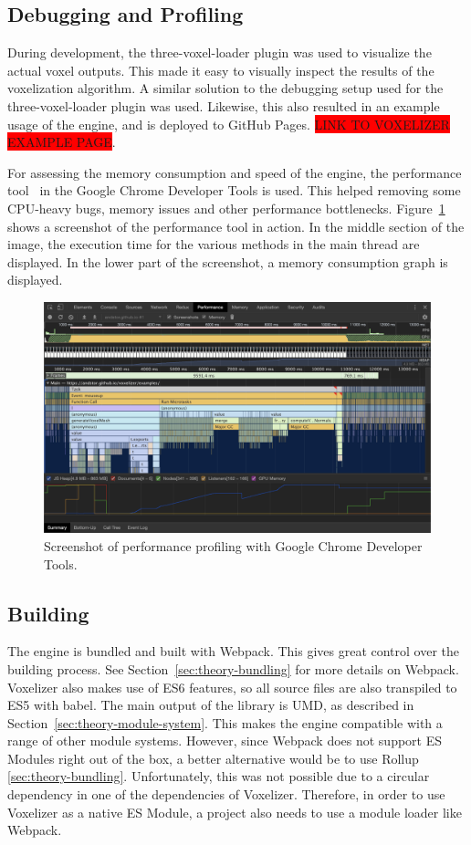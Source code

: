\subsection{Debugging and Profiling}
During development, the three-voxel-loader plugin was used to visualize the actual voxel outputs. This made it easy to visually inspect the results of the voxelization algorithm. A similar solution to the debugging setup used for the three-voxel-loader plugin was used. Likewise, this also resulted in an example usage of the engine, and is deployed to GitHub Pages. \colorbox{red}{LINK TO VOXELIZER EXAMPLE PAGE}.

For assessing the memory consumption and speed of the engine, the performance tool~\cite{chrome-dev-tools-profiler} in the Google Chrome Developer Tools is used. This helped removing some CPU-heavy bugs, memory issues and other performance bottlenecks. Figure~\ref{fig:chrome-devtools-performance} shows a screenshot of the performance tool in action. In the middle section of the image, the execution time for the various methods in the main thread are displayed. In the lower part of the screenshot, a memory consumption graph is displayed.
\begin{figure}[ht]
    \centering
    \includegraphics[width=\textwidth]{sections/methodology/figures/chrome-dev-tools-performance.png}
    \caption{Screenshot of performance profiling with Google Chrome Developer Tools.}
    \label{fig:chrome-devtools-performance}
\end{figure}

\subsection{Building}
The engine is bundled and built with Webpack. This gives great control over the building process. See Section~\ref{sec:theory-bundling} for more details on Webpack. Voxelizer also makes use of ES6 features, so all source files are also transpiled to ES5 with babel. The main output of the library is UMD, as described in Section~\ref{sec:theory-module-system}. This makes the engine compatible with a range of other module systems. However, since Webpack does not support ES Modules right out of the box, a better alternative would be to use Rollup \ref{sec:theory-bundling}. Unfortunately, this was not possible due to a circular dependency in one of the dependencies of Voxelizer. Therefore, in order to use Voxelizer as a native ES Module, a project also needs to use a module loader like Webpack.

